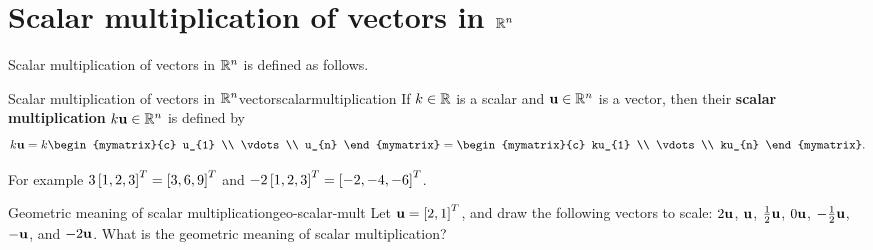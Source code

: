\section{Scalar multiplication of vectors in \texorpdfstring{$\mathbb{R}^n$}{Rn}}

Scalar multiplication of vectors in $\mathbb{R}^n$ is defined as 
follows.

\begin{definition}{Scalar multiplication of vectors in $\mathbb{R}^n$}{vectorscalarmultiplication}
  If $k\in\mathbb{R}$ is a scalar and $\mbox{\bf u}\in \mathbb{R}^{n}$ is a vector, then
  their
  \textbf{scalar multiplication}
  $k\mbox{\bf u}\in \mathbb{R}^{n}$ is defined by
  \begin{equation*}
    k\vect{u}=k\begin{mymatrix}{c}
      u_{1} \\
      \vdots \\
      u_{n}
    \end{mymatrix} = \begin{mymatrix}{c}
      ku_{1} \\
      \vdots \\
      ku_{n}
    \end{mymatrix}.
  \end{equation*}
\end{definition}

For example $3 \left[ 1, 2, 3 \right]^T = \left[ 3, 6, 9 \right]^T$ and
$-2\left[ 1, 2, 3 \right]^T = \left[ -2, -4, -6 \right]^T$.

\begin{example}{Geometric meaning of scalar multiplication}{geo-scalar-mult}
  Let $\mbox{\bf u}=\left[2,1\right]^T$, and draw the following vectors to scale:
  $2\mbox{\bf u}$, $\mbox{\bf u}$, $\frac{1}{2}\mbox{\bf u}$, $0\mbox{\bf u}$,
  $-\frac{1}{2}\mbox{\bf u}$, $-\mbox{\bf u}$, and $-2\mbox{\bf u}$.  What is the
  geometric meaning of scalar multiplication?
\end{example}

